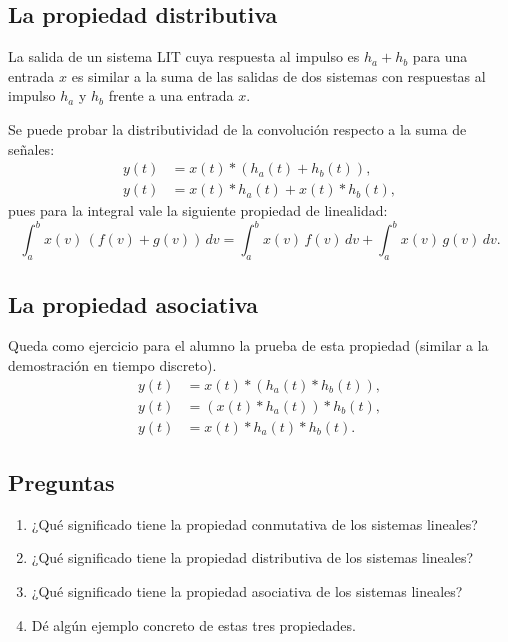 \documentclass[11pt,a4paper,openany]{book}
\begin{document}
\subsection{La propiedad distributiva}

La salida de un sistema LIT cuya respuesta al impulso es $h_{a} + h_{b}$ para una entrada $x$ es similar a la suma de las salidas de dos sistemas con respuestas al impulso $h_{a}$ y $h_{b}$ frente a una entrada $x$.

Se puede probar la distributividad de la convolución respecto a la suma de señales:
\begin{align}
	y(t) &= x(t) * \left( h_a(t) + h_{b}(t) \right) , \\
	y(t) &= x(t) * h_a(t) + x(t) * h_{b}(t),
\end{align}
pues para la integral vale la siguiente propiedad de linealidad:
\begin{equation}
	\int_{a}^{b} x(v) \, (f(v) + g(v)) \, dv = \int_{a}^{b} x(v) \, f(v) \, dv + \int_{a}^{b} x(v) \, g(v) \, dv.
\end{equation}

\subsection{La propiedad asociativa}

Queda como ejercicio para el alumno la prueba de esta propiedad (similar a la demostración en tiempo discreto).
\begin{align}
	y(t) &= x(t) * \left( h_a(t) * h_{b}(t) \right) , \\
	y(t) &= \left( x(t) * h_a(t) \right) * h_{b}(t) , \\
	y(t) &= x(t) * h_a(t) * h_{b}(t) .
\end{align}

\subsection{Preguntas}

\begin{enumerate}
	\item ¿Qué significado tiene la propiedad conmutativa de los sistemas lineales?
	\item ¿Qué significado tiene la propiedad distributiva de los sistemas lineales?
	\item ¿Qué significado tiene la propiedad asociativa de los sistemas lineales?
	\item Dé algún ejemplo concreto de estas tres propiedades.
\end{enumerate}
\end{document}

